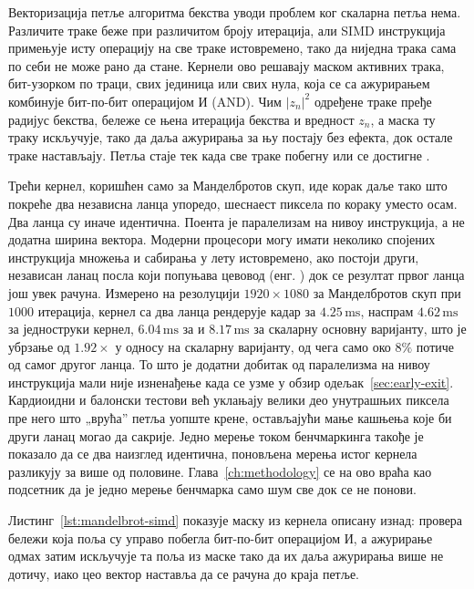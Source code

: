 \documentclass[serbian]{ftndiplomski}
\begin{document}
Векторизација петље алгоритма бекства уводи проблем ког скаларна петља нема. Различите
траке беже при различитом броју итерација, али SIMD инструкција примењује исту
операцију на све траке истовремено, тако да ниједна трака сама по себи не може рано да
стане. Кернели ово решавају маском активних трака, бит-узорком по траци, свих
јединица или свих нула, која се са ажурирањем комбинује бит-по-бит операцијом И
(AND). Чим $|z_n|^2$ одређене траке пређе радијус бекства, бележе се њена итерација
бекства и вредност $z_n$, а маска ту траку искључује, тако да даља ажурирања за њу
постају без ефекта, док остале траке настављају. Петља стаје тек када све траке побегну
или се достигне .

Трећи кернел, коришћен само за Манделбротов скуп, иде корак даље тако што покреће два
независна ланца  упоредо, шеснаест пиксела по кораку уместо осам. Два ланца
су иначе идентична. Поента је паралелизам на нивоу инструкција, а не додатна ширина
вектора. Модерни процесори могу имати неколико спојених инструкција множења и сабирања
у лету истовремено, ако постоји други, независан ланац посла који попуњава цевовод
(енг. ) док
се резултат првог ланца још увек рачуна. Измерено на резолуцији $1920\times1080$ за
Манделбротов скуп при $1000$ итерација, кернел са два ланца рендерује кадар за
$4.25\,\mathrm{ms}$, наспрам $4.62\,\mathrm{ms}$ за једноструки  кернел,
$6.04\,\mathrm{ms}$ за  и $8.17\,\mathrm{ms}$ за скаларну основну варијанту,
што је убрзање од $1.92\times$ у односу на скаларну варијанту, од чега само око $8\%$
потиче од самог другог ланца. То што је додатни добитак од паралелизма на нивоу
инструкција мали није изненађење када се узме у обзир одељак~\ref{sec:early-exit}.
Кардиоидни и балонски тестови већ уклањају велики део унутрашњих пиксела пре него што
„врућа'' петља уопште крене, остављајући мање кашњења које би други ланац могао да
сакрије. Једно мерење током бенчмаркинга такође је показало да се два наизглед
идентична, поновљена мерења истог кернела разликују за више од половине.
Глава~\ref{ch:methodology} се на ово враћа као подсетник да је једно мерење бенчмарка
само шум све док се не понови.

Листинг~\ref{lst:mandelbrot-simd} показује маску  из 
кернела описану изнад: провера  бележи која поља су управо
побегла бит-по-бит операцијом И, а ажурирање  одмах затим искључује та
поља из маске тако да их даља ажурирања више не дотичу, иако цео вектор наставља
да се рачуна до краја петље.
\end{document}
